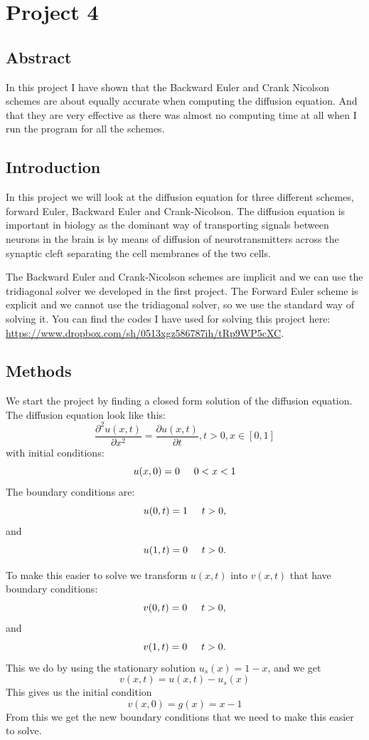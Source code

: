 \documentclass[a4wide,12pt]{article}
\begin{document}
\section*{Project 4}
\subsection*{Abstract}
In this project I have shown that the Backward Euler and Crank Nicolson schemes are about equally accurate when computing the diffusion equation.
And that they are very effective as there was almost no computing time at all when I run the program for all the schemes. 
\subsection*{Introduction}
In this project we will look at the diffusion equation for three different schemes, forward Euler, Backward Euler and Crank-Nicolson. The diffusion equation is important in biology as the dominant way of transporting signals between neurons in the brain is by means of diffusion of neurotransmitters across the synaptic cleft separating the cell membranes of the two cells.

The Backward Euler and Crank-Nicolson schemes are implicit and we can use the tridiagonal solver we developed in the first project. The Forward Euler scheme is explicit and we cannot use the tridiagonal solver, so we use the standard way of solving it. You can find the codes I have used for solving this project here: \url{https://www.dropbox.com/sh/0513xgz586787ih/tRp9WP5cXC}. 

\subsection*{Methods}
We start the project by finding a closed form solution of the diffusion equation. The diffusion equation look like this:
\[
 \frac{\partial^2 u(x,t)}{\partial x^2} =\frac{\partial u(x,t)}{\partial t}, t > 0, x\in [0,1]
\]
with initial conditions:
\[
u(x,0)= 0 \hspace{0.5cm} 0 < x < 1
\]
The boundary conditions are:
\[
u(0,t)= 1 \hspace{0.5cm} t > 0,
\]
and 
\[
u(1,t)= 0 \hspace{0.5cm} t > 0.
\]

To make this easier to solve we transform $u(x,t)$ into $v(x,t)$ that have boundary conditions:
\[
v(0,t)= 0 \hspace{0.5cm} t > 0,
\]
and 
\[
v(1,t)= 0 \hspace{0.5cm} t > 0.
\]
This we do by using the stationary solution $u_{s}(x) = 1-x$, and we get
\[
v(x,t) = u(x,t) - u_{s}(x)
\]
This gives us the initial condition
\[
v(x,0) = g(x) = x-1
\]
From this we get the new boundary conditions that we need to make this easier to solve. 
\end{document}
